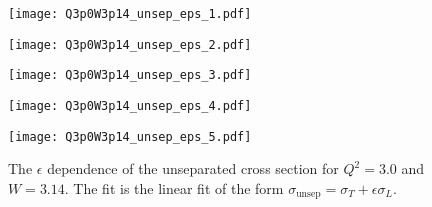 \begin{figure}
  \centering
  \begin{minipage}[b]{0.48\linewidth}
    \texttt{[image: Q3p0W3p14\_unsep\_eps\_1.pdf]}
  \end{minipage}
  \hfill
  \begin{minipage}[b]{0.48\linewidth}
    \texttt{[image: Q3p0W3p14\_unsep\_eps\_2.pdf]}
  \end{minipage}
  \begin{minipage}[b]{0.48\linewidth}
    \texttt{[image: Q3p0W3p14\_unsep\_eps\_3.pdf]}
  \end{minipage}
  \hfill
  \begin{minipage}[b]{0.48\linewidth}
    \texttt{[image: Q3p0W3p14\_unsep\_eps\_4.pdf]}
  \end{minipage}
  \begin{minipage}[b]{0.48\linewidth}
    \texttt{[image: Q3p0W3p14\_unsep\_eps\_5.pdf]}
  \end{minipage}
  \caption{The $\epsilon$ dependence of the unseparated cross section for $Q^2=3.0$ and $W=3.14$. The fit is the linear fit of the form $\sigma_{\mathrm{unsep}}=\sigma_T+\epsilon\sigma_L$.}
  \label{fig:Q3p0W3p14_unsep_eps}
\end{figure}

